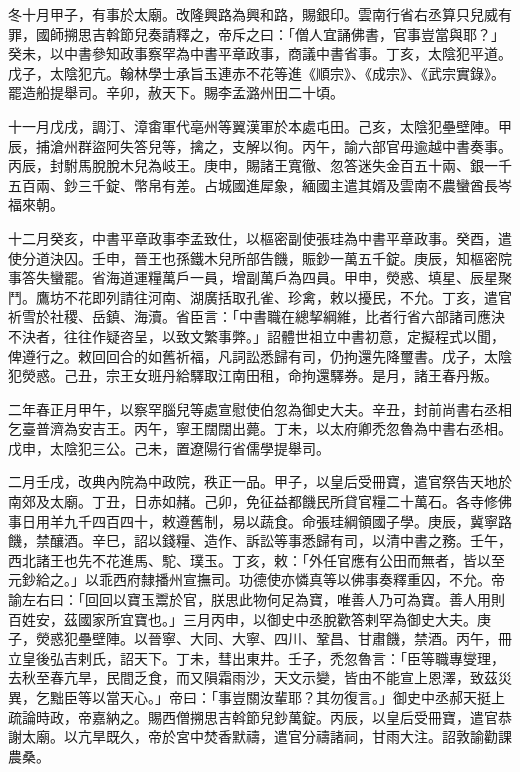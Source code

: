 \begin{pinyinscope}
 冬十月甲子，有事於太廟。改隆興路為興和路，賜銀印。雲南行省右丞算只兒威有罪，國師搠思吉斡節兒奏請釋之，帝斥之曰：「僧人宜誦佛書，官事豈當與耶？」癸未，以中書參知政事察罕為中書平章政事，商議中書省事。丁亥，太陰犯平道。戊子，太陰犯亢。翰林學士承旨玉連赤不花等進《順宗》、《成宗》、《武宗實錄》。罷造船提舉司。辛卯，赦天下。賜李孟潞州田二十頃。



 十一月戊戌，調汀、漳畬軍代亳州等翼漢軍於本處屯田。己亥，太陰犯壘壁陣。甲辰，捕滄州群盜阿失答兒等，擒之，支解以徇。丙午，諭六部官毋逾越中書奏事。丙辰，封駙馬脫脫木兒為岐王。庚申，賜諸王寬徹、忽答迷失金百五十兩、銀一千五百兩、鈔三千錠、幣帛有差。占城國進犀象，緬國主遣其婿及雲南不農蠻酋長岑福來朝。



 十二月癸亥，中書平章政事李孟致仕，以樞密副使張珪為中書平章政事。癸酉，遣使分道決囚。壬申，晉王也孫鐵木兒所部告饑，賑鈔一萬五千錠。庚辰，知樞密院事答失蠻罷。省海道運糧萬戶一員，增副萬戶為四員。甲申，熒惑、填星、辰星聚鬥。鷹坊不花即列請往河南、湖廣括取孔雀、珍禽，敕以擾民，不允。丁亥，遣官祈雪於社稷、岳鎮、海瀆。省臣言：「中書職在總挈綱維，比者行省六部諸司應決不決者，往往作疑咨呈，以致文繁事弊。」詔體世祖立中書初意，定擬程式以聞，俾遵行之。敕回回合的如舊祈福，凡詞訟悉歸有司，仍拘還先降璽書。戊子，太陰犯熒惑。己丑，宗王女班丹給驛取江南田租，命拘還驛券。是月，諸王春丹叛。



 二年春正月甲午，以察罕腦兒等處宣慰使伯忽為御史大夫。辛丑，封前尚書右丞相乞臺普濟為安吉王。丙午，寧王闊闊出薨。丁未，以太府卿禿忽魯為中書右丞相。戊申，太陰犯三公。己未，置遼陽行省儒學提舉司。



 二月壬戌，改典內院為中政院，秩正一品。甲子，以皇后受冊寶，遣官祭告天地於南郊及太廟。丁丑，日赤如赭。己卯，免征益都饑民所貸官糧二十萬石。各寺修佛事日用羊九千四百四十，敕遵舊制，易以蔬食。命張珪綱領國子學。庚辰，冀寧路饑，禁釀酒。辛巳，詔以錢糧、造作、訴訟等事悉歸有司，以清中書之務。壬午，西北諸王也先不花進馬、駝、璞玉。丁亥，敕：「外任官應有公田而無者，皆以至元鈔給之。」以乖西府隸播州宣撫司。功德使亦憐真等以佛事奏釋重囚，不允。帝諭左右曰：「回回以寶玉鬻於官，朕思此物何足為寶，唯善人乃可為寶。善人用則百姓安，茲國家所宜寶也。」三月丙申，以御史中丞脫歡答剌罕為御史大夫。庚子，熒惑犯壘壁陣。以晉寧、大同、大寧、四川、鞏昌、甘肅饑，禁酒。丙午，冊立皇後弘吉剌氏，詔天下。丁未，彗出東井。壬子，禿忽魯言：「臣等職專燮理，去秋至春亢旱，民間乏食，而又隕霜雨沙，天文示變，皆由不能宣上恩澤，致茲災異，乞黜臣等以當天心。」帝曰：「事豈關汝輩耶？其勿復言。」御史中丞郝天挺上疏論時政，帝嘉納之。賜西僧搠思吉斡節兒鈔萬錠。丙辰，以皇后受冊寶，遣官恭謝太廟。以亢旱既久，帝於宮中焚香默禱，遣官分禱諸祠，甘雨大注。詔敦諭勸課農桑。




\end{pinyinscope}
